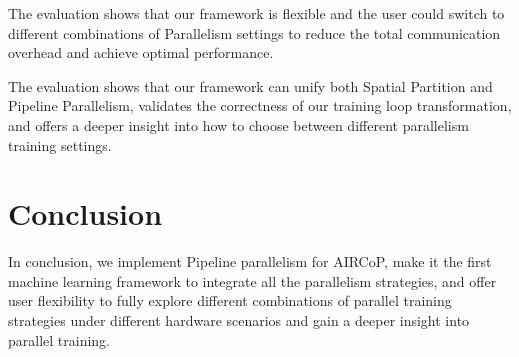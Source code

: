 \documentclass[sigplan]{acmart}\settopmatter{printfolios=true,printccs=false,printacmref=false}
\begin{document}
 The evaluation shows that our framework is flexible and the user could switch to different combinations of Parallelism settings to reduce the total communication overhead and achieve optimal performance.\par
 The evaluation shows that our framework can unify both Spatial Partition and Pipeline Parallelism, validates the correctness of our training loop transformation, and offers a deeper insight into how to choose between different parallelism training settings.
 \section{Conclusion} \label{conclusion}
In conclusion, we implement Pipeline parallelism for AIRCoP, make it the first machine learning framework to integrate all the parallelism strategies, and offer user flexibility to fully explore different combinations of parallel training strategies under different hardware scenarios and gain a deeper insight into parallel training.


\end{document}
